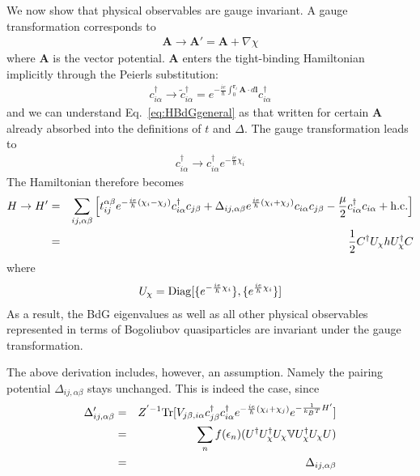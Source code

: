 \documentclass[aps,physrev,amsmath,amssymb]{revtex4-2}
\begin{document}
We now show that physical observables are gauge invariant. A gauge transformation corresponds to
\begin{eqnarray}
	\mathbf A\rightarrow \mathbf A' = \mathbf A + \nabla \chi
\end{eqnarray}
where $\mathbf A$ is the vector potential. $\mathbf A$ enters the tight-binding Hamiltonian implicitly through the Peierls substitution:
\begin{eqnarray}\label{eq:peierls}
	c_{i\alpha}^\dag \rightarrow \tilde{c}^\dag_{i\alpha} = e^{-\frac{ie}{\hbar} \int_0^{\mathbf r_i} \mathbf A\cdot d \mathbf l} c_{i\alpha}^\dag
\end{eqnarray} 
and we can understand Eq.~\eqref{eq:HBdGgeneral} as that written for certain $\mathbf A$ already absorbed into the definitions of $t$ and $\Delta$. The gauge transformation leads to 
\begin{eqnarray}
	c^\dag_{i\alpha} \rightarrow c^\dag_{i\alpha} e^{-\frac{ie}{\hbar}\chi_i}
\end{eqnarray}
The Hamiltonian therefore becomes
\begin{eqnarray}
	H\rightarrow H'&=& \sum_{ij,\alpha\beta}\left[ t_{ij}^{\alpha\beta} e^{-\frac{ie}{\hbar}(\chi_i - \chi_j)} c_{i\alpha}^\dag c_{j\beta} + \Delta_{ij,\alpha\beta} e^{\frac{ie}{\hbar}(\chi_i + \chi_j)}c_{i\alpha}c_{j\beta}  - \frac{\mu}{2}c_{i\alpha}^\dag c_{i\alpha} + {\rm h.c.} \right] \\\nonumber
	&=&\frac{1}{2}C^\dag U_\chi h U_\chi^\dag C
\end{eqnarray}
where 
\begin{eqnarray}
	U_\chi = {\rm Diag}[\{e^{-\frac{ie}{\hbar}\chi_i}\},\{e^{\frac{ie}{\hbar}\chi_i}\}]
\end{eqnarray}
As a result, the BdG eigenvalues as well as all other physical observables represented in terms of Bogoliubov quasiparticles are invariant under the gauge transformation.

The above derivation includes, however, an assumption. Namely the pairing potential $\Delta_{ij,\alpha\beta}$ stays unchanged. This is indeed the case, since
\begin{eqnarray}
	\Delta'_{ij,\alpha\beta} &=& Z^{'-1}{\rm Tr}[V_{j\beta,i\alpha} c^\dag_{j\beta}c^{\dag}_{i\alpha} e^{-\frac{ie}{\hbar}(\chi_i + \chi_j)} e^{-\frac{1}{k_B T}H'}] \\\nonumber
	&=& \sum_{n}f(\epsilon_n) (U^\dag U^\dag_\chi U_\chi \mathbb{V} U_\chi^\dag U_\chi U) \\\nonumber
	&=&\Delta_{ij,\alpha\beta}
\end{eqnarray}
\end{document}
